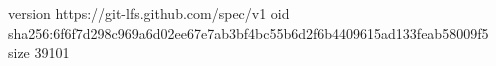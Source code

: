 version https://git-lfs.github.com/spec/v1
oid sha256:6f6f7d298c969a6d02ee67e7ab3bf4bc55b6d2f6b4409615ad133feab58009f5
size 39101
